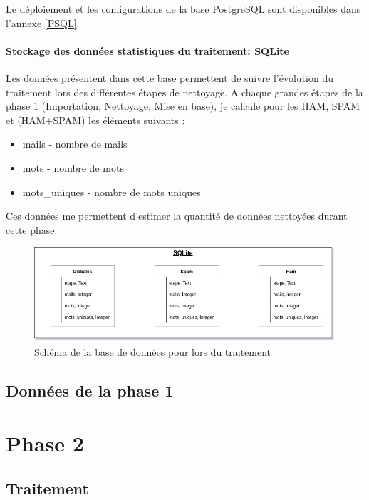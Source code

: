 \documentclass[a4paper,12pt]{article}
\begin{document}
				Le déploiement et les configurations de la base PostgreSQL sont disponibles dans l'annexe \ref{PSQL}.
			
			
			\paragraph{Stockage des données statistiques du traitement: SQLite}
				Les données présentent dans cette base permettent de suivre l'évolution du traitement lors des différentes étapes de nettoyage. 
				A chaque grandes étapes de la phase 1 (Importation, Nettoyage, Mise en base), je calcule pour les HAM, SPAM et (HAM+SPAM) les éléments suivants :
				\begin{itemize}
					\item mails - nombre de mails
					\item mots - nombre de mots 
					\item mots\_uniques - nombre de mots uniques
				\end{itemize}
				
				Ces données me permettent d'estimer la quantité de données nettoyées durant cette phase.
				
				\begin{figure}[H]
					\includegraphics[width=\linewidth]{img/Schemasqlite.jpg}
					\caption{Schéma de la base de données pour lors du traitement}
				\end{figure}
							
			
	
	\subsection{Données de la phase 1}
		
		
	
\newpage
\section{Phase 2}
	\subsection{Traitement}
	
\end{document}
